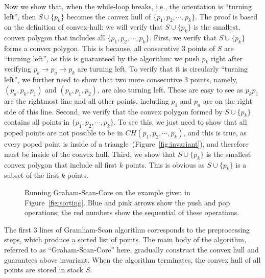 

Now we show that, when the while-loop breaks, i.e., the orientation is ``turning left'', then  
$S\cup \{p_k\}$ becomes the convex hull of $\{p_1, p_2, \cdots, p_k\}$.
The proof is based on the definition of convex-hull: we will verify that $S\cup \{p_k\}$ is the smallest, convex polygon that includes all $\{p_1, p_2, \cdots, p_k\}$.
First, we verify that $S\cup \{p_k\}$ forms a convex polygon. This is because, all consecutive 3 points of $S$ are ``turning left'', as this is guaranteed by the algorithm: 
we push $p_k$ right after verifying $p_b\to p_a\to p_k$ are turning left.
To verify that it is circularly ``turning left'', we further need to show that two more consecutive 3 points, namely, $(p_a, p_k, p_1)$ and $(p_k, p_1, p_2)$,
are also turning left.  These are easy to see as $p_kp_1$ are the rightmost line and all other points, including $p_1$ and $p_a$ are on the right side of this line.
Second, we verify that the convex polygon formed by $S\cup \{p_k\}$ contains all points in $\{p_1,p_2,\cdots, p_k\}$.
To see this, we just need to show that all poped points are not possible to be in $CH(p_1, p_2, \cdots, p_k)$,
and this is true, as every poped point is inside of a triangle~(Figure~\ref{fig:invariant}), and therefore must be inside of the convex hull. %
Third, we show that $S\cup \{p_k\}$ is the smallest convex polygon that include all first $k$ points.
This is obvious as $S\cup \{p_k\}$ is a subset of the first $k$ points.


\begin{figure}[h!]
\centering{}
\caption{Running Graham-Scan-Core on the example given in Figure~\ref{fig:sorting}.
Blue and pink arrows show the push and pop operations; the red numbers show
the sequential of these operations.}
\end{figure}


The first 3 lines of Gramham-Scan algorithm corresponds to the preprocessing steps,
which produce a sorted list of points. The main body of the algorithm, referred
to as ``Graham-Scan-Core'' here, gradually construct the convex hull and guarantees
above invariant. When the algorithm terminates, the convex hull of all points
are stored in stack $S$.

